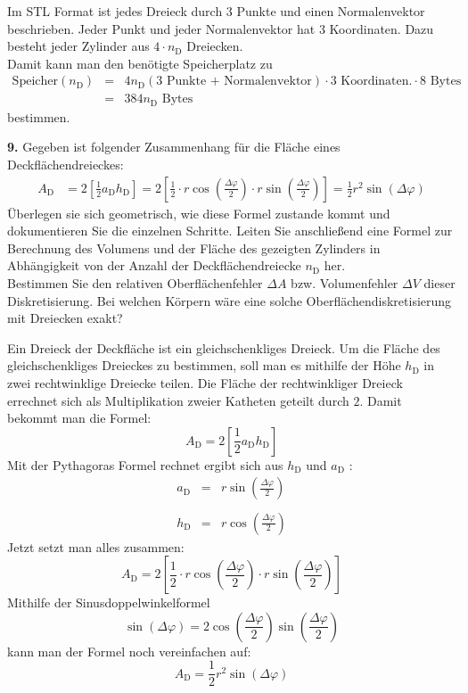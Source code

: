 \documentclass[Protokollheft.tex]{subfiles}
\begin{document}
Im STL Format ist jedes Dreieck durch 3 Punkte und einen Normalenvektor beschrieben. Jeder Punkt und jeder Normalenvektor hat 3 Koordinaten. Dazu besteht jeder Zylinder aus $4 \cdot n_\text{D}$ Dreiecken.\\
Damit kann man den benötigte Speicherplatz zu 
 	\begin{eqnarray*}
 		\text{Speicher}(n_\mathrm{D})&=&4n_\mathrm{D}(3\text{ Punkte + Normalenvektor})\cdot 3 \text{ Koordinaten.}\cdot 8\text{ Bytes}\\
 		&=&384n_\mathrm{D} \text{ Bytes}
 	\end{eqnarray*}
bestimmen. 
    \begin{framed}
	\noindent \textbf{9.} Gegeben ist folgender Zusammenhang für die Fläche eines Deckflächendreieckes:
        \begin{align}
        A_\text{D} &= 2 \left[\frac12 a_\text{D} h_\text{D}\right] = 2 \left[ \frac12 \cdot r \cos\left(\frac{\Delta \varphi}{2}\right)\cdot r \sin\left(\frac{\Delta \varphi}{2}\right)  \right] = \frac12 r^2 \sin(\Delta\varphi)
        \end{align}
        Überlegen sie sich geometrisch, wie diese Formel zustande kommt und dokumentieren Sie die einzelnen Schritte. Leiten Sie anschließend eine Formel zur Berechnung des Volumens und der Fläche des gezeigten Zylinders in Abhängigkeit von der Anzahl der Deckflächendreiecke $n_\mathrm{D}$ her.\\
        Bestimmen Sie den relativen Oberflächenfehler $\Delta A$ bzw. Volumenfehler $\Delta V$ dieser Diskretisierung.
        Bei welchen Körpern wäre eine solche Oberflächendiskretisierung mit Dreiecken exakt?\label{exer:deltaAdeltaV}
\end{framed}

Ein Dreieck der Deckfläche ist ein gleichschenkliges Dreieck. Um die Fläche des gleichschenkliges Dreieckes zu bestimmen, soll man es mithilfe der Höhe  $h_\text{D}$ in zwei rechtwinklige Dreiecke teilen. Die Fläche der rechtwinkliger Dreieck errechnet sich als Multiplikation zweier Katheten geteilt durch $2$. Damit bekommt man die Formel: 
$$ A_\text{D} = 2 \left[\frac12 a_\text{D} h_\text{D}\right]$$
Mit der Pythagoras Formel rechnet ergibt sich aus $h_\text{D}$ und $a_\text{D}$ :
\begin{eqnarray*}
	a_\text{D}&=&r \sin\left(\frac{\Delta \varphi}{2}\right)\\
	\\
	h_\text{D}&=&r \cos\left(\frac{\Delta \varphi}{2}\right)
\end{eqnarray*}
Jetzt setzt man alles zusammen:
 $$A_\text{D} = 2 \left[ \frac12 \cdot r \cos\left(\frac{\Delta \varphi}{2}\right)\cdot r \sin\left(\frac{\Delta \varphi}{2}\right)  \right]$$
 Mithilfe der Sinusdoppelwinkelformel
 $$  \sin(\Delta\varphi)=2 \cos\left(\frac{\Delta \varphi}{2}\right) \sin\left(\frac{\Delta \varphi}{2}\right)  $$
 kann man der Formel noch vereinfachen auf:
  $$A_\text{D} =  \frac12 r^2 \sin(\Delta\varphi)$$
  
\end{document}
